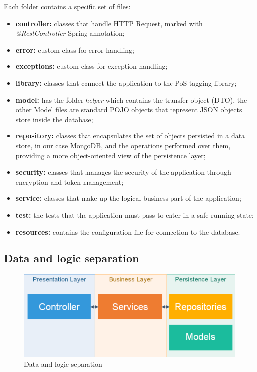 Each folder contains a specific set of files:
\begin{itemize}
\item  \textbf{controller:} classes that handle HTTP Request, marked with \textit{@RestController} Spring annotation;
\item  \textbf{error:} custom class for error handling;
\item  \textbf{exceptions:} custom class for exception handling;
\item  \textbf{library:} classes that connect the application to the PoS-tagging library;
\item  \textbf{model:} has the folder \textit{helper} which contains the transfer object (DTO), the other Model files are standard POJO objects that represent JSON objects store inside the database;
\item  \textbf{repository:} classes that encapsulates the set of objects persisted in a data store, in our case MongoDB, and the operations performed over them, providing a more object-oriented view of the persistence layer;
\item  \textbf{security:} classes that manages the security of the application through encryption and token management;
\item  \textbf{service:} classes that make up the logical business part of the application;
\item  \textbf{test:}  the tests that the application must pass to enter in a safe running state;
\item \textbf{resources:} contains the configuration file for connection to the database.
\end{itemize}

\subsection{Data and logic separation}
\begin{figure}[H]
\centering 
\includegraphics[scale=0.3]{uml/backendArchitecture.png} 
\caption{Data and logic separation}
\end{figure}

